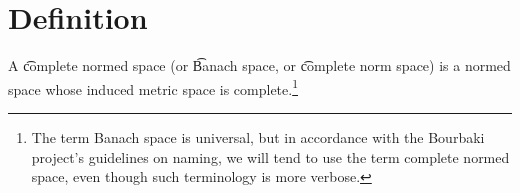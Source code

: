 
\section*{Definition}

A \t{complete normed space} (or \t{Banach space}, or \t{complete norm space}) is a normed space whose induced metric space is complete.\footnote{The term Banach space is universal, but in accordance with the Bourbaki project's guidelines on naming, we will tend to use the term complete normed space, even though such terminology is more verbose.}

\blankpage